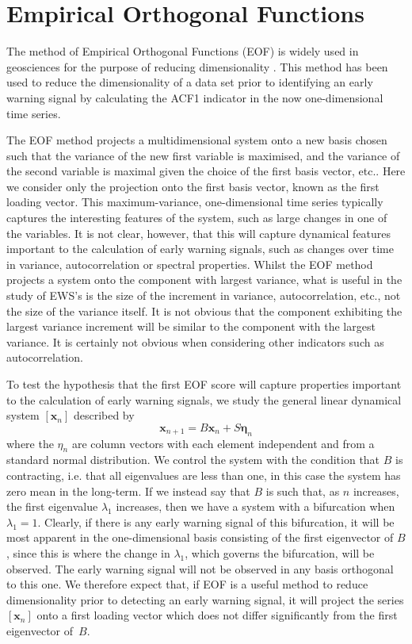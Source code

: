 \documentclass[%
aip,
amsmath,amssymb,
reprint,%
]{revtex4-1}
\newcommand{\noteRed}[1]{{#1}}
\begin{document}
\section{Empirical Orthogonal Functions}
\label{sec:EOF}

The method of Empirical Orthogonal Functions (EOF) is widely used in geosciences for the purpose of reducing dimensionality \cite{bjornsson1997,shaw2009}. This method has been used \cite{held2004} to reduce the dimensionality of a data set prior to identifying an early warning signal by calculating the ACF1 indicator in the now one-dimensional time series.

The EOF method projects a multidimensional system onto a new basis chosen such that the variance of the new first variable is maximised, and the variance of the second variable is maximal given the choice of the first basis vector, etc.. Here we consider only the projection onto the first basis vector, known as the first loading vector. This maximum-variance, one-dimensional time series typically captures the interesting features of the system, such as large changes in one of the variables. It is not clear, however, that this will capture dynamical features important to the calculation of early warning signals, such as changes over time in variance, autocorrelation or spectral properties. Whilst the EOF method projects a system onto the component with largest variance, what is useful in the study of EWS's is the size of the {\noteRed increment} in variance, autocorrelation, etc., not the size of the variance itself. {\noteRed It is not obvious that the component exhibiting the largest variance increment will be similar to the component with the largest variance.} It is certainly not obvious when considering other indicators such as autocorrelation.

To test the hypothesis that the first EOF score will capture properties important to the calculation of early warning signals, we study the general {\noteRed linear} dynamical system $[\mathbf{x}_n]$ described by
\begin{equation}
\mathbf{x}_{n+1} = B\mathbf{x}_n + S\mathbf{\eta}_n
\label{eqn_discreteSystem}
\end{equation}
where the $\eta_n$ are column vectors with each element independent and from a standard normal distribution. We control the system with the condition that $B$ is contracting, i.e. that all eigenvalues are less than one, in this case {\noteRed the system has zero mean in the long-term.} If we instead say that $B$ is such that, as $n$ increases, the first eigenvalue $\lambda_1$ increases, then we have a system with a bifurcation when $\lambda_1=1$. Clearly, if there is any early warning signal of this bifurcation, it will be most apparent in the one-dimensional basis consisting of the first eigenvector of $B$, since this is where the change in $\lambda_1$, which governs the bifurcation, will be observed. The early warning signal will not be observed in any basis orthogonal to this one. We therefore expect that, if EOF is a useful method to reduce dimensionality prior to detecting an early warning signal, it will project the series $[\mathbf{x}_n]$ onto a first loading vector which does not differ significantly from the first eigenvector of~$B$. 
\end{document}
